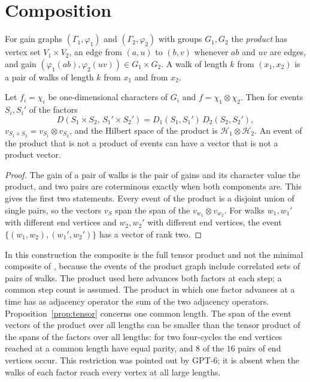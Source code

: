 \section{Composition}\label{sec:compo}

For gain graphs $(\Gamma_1,\varphi_1)$ and $(\Gamma_2,\varphi_2)$ with groups $G_1,G_2$ the \emph{product} has vertex set $V_1\times V_2$, an edge from $(a,u)$ to $(b,v)$ whenever $ab$ and $uv$ are edges, and gain $(\varphi_1(ab),\varphi_2(uv))\in G_1\times G_2$. A walk of length $k$ from $(x_1,x_2)$ is a pair of walks of length $k$ from $x_1$ and from $x_2$.

\begin{proposition}\label{prop:tensor}
Let $f_i=\chi_i$ be one-dimensional characters of $G_i$ and $f=\chi_1\otimes\chi_2$. Then for events $S_i,S_i'$ of the factors
\[
D(S_1\times S_2,\,S_1'\times S_2')=D_1(S_1,S_1')\,D_2(S_2,S_2'),
\]
$v_{S_1\times S_2}=v_{S_1}\otimes v_{S_2}$, and the Hilbert space of the product is $\mathcal{H}_1\otimes\mathcal{H}_2$. An event of the product that is not a product of events can have a vector that is not a product vector.
\end{proposition}
\begin{proof}
The gain of a pair of walks is the pair of gains and its character value the product, and two pairs are coterminous exactly when both components are. This gives the first two statements. Every event of the product is a disjoint union of single pairs, so the vectors $v_S$ span the span of the $v_{w_1}\otimes v_{w_2}$. For walks $w_1,w_1'$ with different end vertices and $w_2,w_2'$ with different end vertices, the event $\{(w_1,w_2),(w_1',w_2')\}$ has a vector of rank two.
\end{proof}

In this construction the composite is the full tensor product and not the minimal composite of \cite{g7}, because the events of the product graph include correlated sets of pairs of walks. The product used here advances both factors at each step; a common step count is assumed. The product in which one factor advances at a time has as adjacency operator the sum of the two adjacency operators. Proposition~\ref{prop:tensor} concerns one common length. The span of the event vectors of the product over all lengths can be smaller than the tensor product of the spans of the factors over all lengths: for two four-cycles the end vertices reached at a common length have equal parity, and $8$ of the $16$ pairs of end vertices occur. This restriction was pointed out by GPT-6; it is absent when the walks of each factor reach every vertex at all large lengths.

